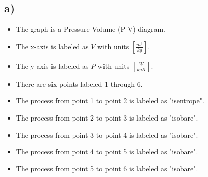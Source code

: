 

\subsection*{a)}

\begin{itemize}
    \item The graph is a Pressure-Volume (P-V) diagram.
    \item The x-axis is labeled as $V$ with units $[\frac{m^3}{kg}]$.
    \item The y-axis is labeled as $P$ with units $[\frac{W}{kgK}]$.
    \item There are six points labeled 1 through 6.
    \item The process from point 1 to point 2 is labeled as "isentrope".
    \item The process from point 2 to point 3 is labeled as "isobare".
    \item The process from point 3 to point 4 is labeled as "isobare".
    \item The process from point 4 to point 5 is labeled as "isobare".
    \item The process from point 5 to point 6 is labeled as "isobare".
\end{itemize}